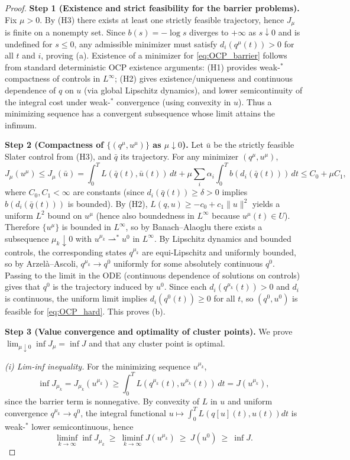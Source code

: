 \begin{proof}
\textbf{Step 1 (Existence and strict feasibility for the barrier problems).}
Fix $\mu>0$. By (H3) there exists at least one strictly feasible trajectory, hence $J_\mu$ is finite on a nonempty set.
Since $b(s)=-\log s$ diverges to $+\infty$ as $s\downarrow 0$ and is undefined for $s\le 0$,
any admissible minimizer must satisfy $d_i(q^\mu(t))>0$ for all $t$ and $i$, proving (a).
Existence of a minimizer for \cref{eq:OCP_barrier} follows from standard deterministic OCP existence arguments:
(H1) provides weak-$^\ast$ compactness of controls in $L^\infty$; (H2) gives existence/uniqueness and continuous dependence
of $q$ on $u$ (via global Lipschitz dynamics), and lower semicontinuity of the integral cost under weak-$^\ast$ convergence
(using convexity in $u$). Thus a minimizing sequence has a convergent subsequence whose limit attains the infimum.

\textbf{Step 2 (Compactness of $\{(q^\mu,u^\mu)\}$ as $\mu\downarrow 0$).}
Let $\bar u$ be the strictly feasible Slater control from (H3), and $\bar q$ its trajectory.
For any minimizer $(q^\mu,u^\mu)$,
\[
J_\mu(u^\mu)\le J_\mu(\bar u)=\int_0^T L(\bar q(t),\bar u(t))\,dt + \mu\sum_i \alpha_i\int_0^T b(d_i(\bar q(t)))\,dt
\le C_0 + \mu C_1,
\]
where $C_0,C_1<\infty$ are constants (since $d_i(\bar q(t))\ge\delta>0$ implies $b(d_i(\bar q(t)))$ is bounded).
By (H2), $L(q,u)\ge -c_0+c_1\|u\|^2$ yields a uniform $L^2$ bound on $u^\mu$ (hence also boundedness in $L^\infty$ because $u^\mu(t)\in U$).
Therefore $\{u^\mu\}$ is bounded in $L^\infty$, so by Banach--Alaoglu there exists a subsequence $\mu_k\downarrow 0$
with $u^{\mu_k}\rightharpoonup^\ast u^0$ in $L^\infty$.
By Lipschitz dynamics and bounded controls, the corresponding states $q^{\mu_k}$ are equi-Lipschitz and uniformly bounded,
so by Arzel\`a--Ascoli, $q^{\mu_k}\to q^0$ uniformly for some absolutely continuous $q^0$.
Passing to the limit in the ODE (continuous dependence of solutions on controls) gives that $q^0$ is the trajectory induced by $u^0$.
Since each $d_i(q^{\mu_k}(t))>0$ and $d_i$ is continuous, the uniform limit implies $d_i(q^0(t))\ge 0$ for all $t$,
so $(q^0,u^0)$ is feasible for \cref{eq:OCP_hard}. This proves (b).

\textbf{Step 3 (Value convergence and optimality of cluster points).}
We prove $\lim_{\mu\downarrow 0}\inf J_\mu = \inf J$ and that any cluster point is optimal.

\emph{(i) {Lim-inf} inequality.}
For the minimizing sequence $u^{\mu_k}$,
\[
\inf J_{\mu_k}=J_{\mu_k}(u^{\mu_k}) \ge \int_0^T L(q^{\mu_k}(t),u^{\mu_k}(t))\,dt = J(u^{\mu_k}),
\]
since the barrier term is nonnegative.
By convexity of $L$ in $u$ and uniform convergence $q^{\mu_k}\to q^0$, the integral functional $u\mapsto\int_0^T L(q[u](t),u(t))dt$
is weak-$^\ast$ lower semicontinuous, hence
\[
\liminf_{k\to\infty} \inf J_{\mu_k} \ \ge\ \liminf_{k\to\infty} J(u^{\mu_k})\ \ge\ J(u^0)\ \ge\ \inf J.
\]


\end{proof}
